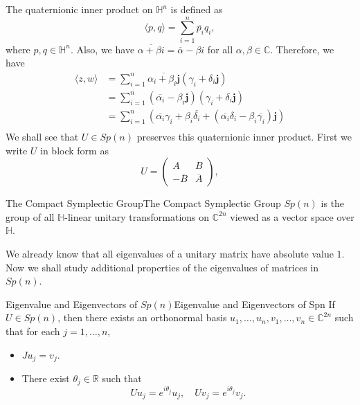 \documentclass[../main.tex]{subfiles}
\begin{document}
\begin{remark}
	The quaternionic inner product on $\mathbb{H}^n$ is defined as
	\begin{equation*}
		\langle p, q \rangle = \sum_{i=1}^n \overline{p_i} q_i,
	\end{equation*}
	where $p,q \in \mathbb{H}^n$. Also, we have $\overline{\alpha + \beta i} = \overline{\alpha} - \beta i$ for all $\alpha, \beta \in \mathbb{C}$. Therefore, we have
	\begin{equation*}
		\begin{aligned}
			\langle z, w \rangle & = \sum_{i=1}^n \overline{\alpha_i + \beta_i \boldsymbol{j}} (\gamma_i + \delta_i \boldsymbol{j})                                                          \\
			                     & = \sum_{i=1}^n (\overline{\alpha_i} - \beta_i \boldsymbol{j}) (\gamma_i + \delta_i \boldsymbol{j})                                                        \\
			                     & = \sum_{i=1}^n (\overline{\alpha_i} \gamma_i + \beta_i \overline{\delta_i} + (\overline{\alpha_i} \delta_i - \beta_i \overline{\gamma_i}) \boldsymbol{j}) \\
		\end{aligned}
	\end{equation*}
	We shall see that $U\in Sp(n)$ preserves this quaternionic inner product. First we write $U$ in block form as
	\begin{equation*}
		U = \begin{pmatrix}
			A             & B            \\
			-\overline{B} & \overline{A}
		\end{pmatrix},
	\end{equation*}
\end{remark}

\begin{theorem}{The Compact Symplectic Group}{The Compact Symplectic Group}
	$Sp(n)$ is the group of all $\mathbb{H}$-linear unitary transformations on $\mathbb{C}^{2n}$ viewed as a vector space over $\mathbb{H}$.
\end{theorem}

We already know that all eigenvalues of a unitary matrix have absolute value $1$. Now we shall study additional properties of the eigenvalues of matrices in $Sp(n)$.

\begin{theorem}{Eigenvalue and Eigenvectors of $Sp(n)$}{Eigenvalue and Eigenvectors of Spn}
	If $U\in Sp(n)$, then there exists an orthonormal basis $u_1, \ldots ,u_n, v_1, \ldots ,v_n\in \mathbb{C}^{2n}$ such that for each $j=1, \ldots , n$,
	\begin{itemize}
		\item $J u_j = v_j$.
		\item There exist $\theta_j \in \mathbb{R}$ such that
		      \begin{equation*}
			      U u_j = e^{i \theta_j} u_j, \quad U v_j = e^{i \theta_j} v_j.
		      \end{equation*}
	\end{itemize}
\end{theorem}
\end{document}
